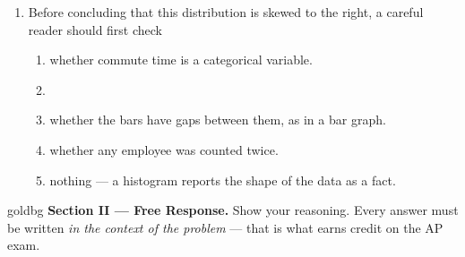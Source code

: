 \documentclass[12pt]{article}
\begin{document}
\begin{enumerate}[leftmargin=1.9em, itemsep=0.11in]
  \item Before concluding that this distribution is skewed to the right, a careful reader should
        first check
        \begin{enumerate}[label=\textbf{(\Alph*)}, leftmargin=2.2em, itemsep=2pt]
          \item whether commute time is a categorical variable.
          \item {}
          \item whether the bars have gaps between them, as in a bar graph.
          \item whether any employee was counted twice.
          \item nothing --- a histogram reports the shape of the data as a fact.
                \hfill{}
        \end{enumerate}

\end{enumerate}

\vspace{0.10in}

\boxguard[16]
\begin{headlinebox}{goldbg}
\small
\textbf{Section II --- Free Response.} Show your reasoning. Every answer must be written
\emph{in the context of the problem} --- that is what earns credit on the AP exam.
\end{headlinebox}

\vspace{0.10in}
\end{document}
